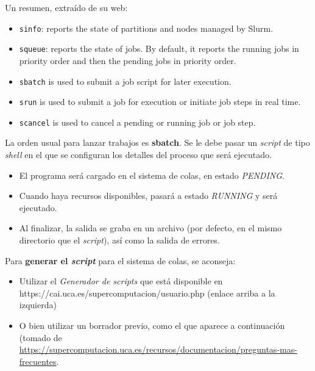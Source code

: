 \documentclass[11pt]{article}
\begin{document}
Un resumen, extraído de su web:
\begin{itemize}
\item \texttt{sinfo}: reports the state of partitions and nodes
  managed by Slurm.
\item \texttt{squeue}: reports the state of jobs. By default, it
  reports the running jobs in priority order and then the pending jobs
  in priority order.
\item \texttt{sbatch} is used to submit a job script for later
  execution.
\item \texttt{srun} is used to submit a job for execution or
  initiate job steps in real time.
\item \texttt{scancel} is used to cancel a pending or running job or
  job step.
\end{itemize}

La orden usual para lanzar trabajos es \textbf{sbatch}. Se le debe
pasar un \textit{script} de tipo \textit{shell} en el que se
configuran los detalles del proceso que será ejecutado.
\begin{itemize}
\item El programa
será cargado en el sistema de colas, en estado \textit{PENDING}.
\item Cuando haya recursos disponibles, pasará a estado
  \textit{RUNNING} y será ejecutado.
\item Al finalizar, la salida se graba en un archivo (por defecto, en
  el mismo directorio que el \textit{script}), así como la salida de
  errores.
\end{itemize}
Para \textbf{generar el \textit{script}} para el sistema de colas, se aconseja:
\begin{itemize}
\item Utilizar el \textit{Generador de scripts} que está disponible en
https://cai.uca.es/supercomputacion/usuario.php (enlace arriba a la izquierda)
\item O bien utilizar un borrador previo, como el que aparece a continuación (tomado de \url{https://supercomputacion.uca.es/recursos/documentacion/preguntas-mas-frecuentes}.
\end{itemize}
\end{document}
